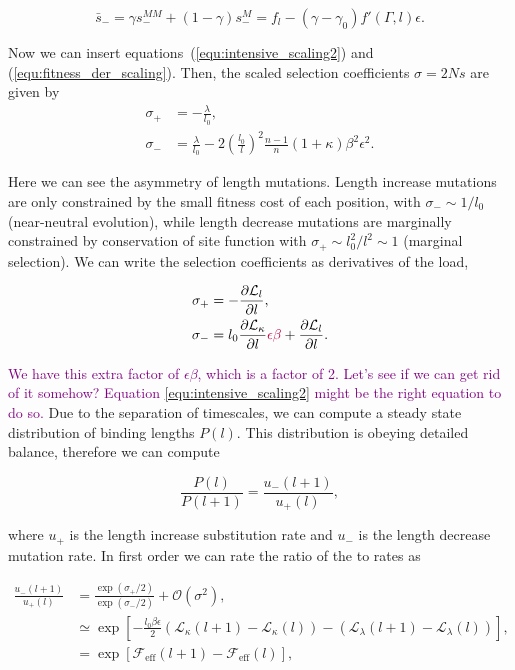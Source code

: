 \documentclass[10pt,a4paper]{article}
\newcommand{\purple}[1]{\textcolor{purple}{#1}}
\begin{document}
\begin{equation}
\bar s_- = \gamma s_-^{MM} + (1-\gamma) s_-^{M} = f_l - (\gamma - \gamma_0)f'(\Gamma, l)\epsilon.
\end{equation}

\noindent Now we can insert equations~(\ref{equ:intensive_scaling2}) and (\ref{equ:fitness_der_scaling}). Then, the scaled selection coefficients $\sigma = 2Ns$ are given by
\begin{align}
	\sigma_+ &= -\frac{\lambda}{l_0},\\
	\sigma_- &= \frac{\lambda}{l_0} - 2\left(\frac{l_0}{l}\right)^2\frac{n-1}{n}(1+\kappa)\beta^2\epsilon^2.
\end{align}

\noindent Here we can see the asymmetry of length mutations. Length increase mutations are only constrained by the small fitness cost of each position, with $\sigma_-\sim 1/l_0$ (near-neutral evolution), while length decrease mutations  are marginally constrained by conservation of site function with $\sigma_+ \sim l_0^2/l^2\sim 1$ (marginal selection). We can write the selection coefficients as derivatives of the load,

\begin{align}
	\sigma_+ &= -\frac{\partial \mathcal{L}_l}{\partial l},\\
	\sigma_- &= l_0\frac{\partial \mathcal{L}_\kappa}{\partial l}\purple{\epsilon\beta} +\frac{\partial \mathcal{L}_l}{\partial l}.
\end{align}

\noindent \purple{We have this extra factor of $\epsilon\beta$, which is a factor of 2. Let's see if we can get rid of it somehow? Equation \ref{equ:intensive_scaling2} might be the right equation to do so.} Due to the separation of timescales, we can compute a steady state distribution of binding lengths $P(l)$. This distribution is obeying detailed balance, therefore we can compute

\begin{equation}
	\frac{P(l)}{P(l+1)}= \frac{u_-(l+1)}{u_+(l)},
\end{equation}

\noindent where $u_+$ is the length increase substitution rate and $u_-$ is the length decrease mutation rate. In first order we can rate the ratio of the to rates as 

\begin{align}
	\frac{u_-(l+1)}{u_+(l)} &= \frac{\exp(\sigma_+/2)}{\exp(\sigma_-/2)} + \mathcal{O}(\sigma^2),\\
	&\simeq\exp\left[ -\frac{l_0\beta\epsilon}{2}\left( \mathcal{L}_\kappa(l+1) - \mathcal{L}_\kappa(l) \right) - \left( \mathcal{L}_\lambda(l+1) - \mathcal{L}_\lambda(l) \right)\right],\\
	&=\exp\left[ \mathcal{F}_\mathrm{eff}(l+1) - \mathcal{F}_\mathrm{eff}(l) \right],
\end{align}
\end{document}
